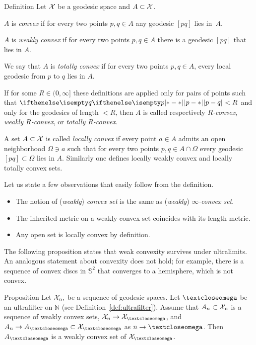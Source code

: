 \begin{thm}{Definition} 
\label{def:convex-set}
Let $\mathcal{X}$ be a geodesic space and $A\subset\spc{X}$.

$A$ is 
\emph{convex}
if for every two points $p,q\in A$ any geodesic $[pq]$ lies in~$A$.

$A$ is 
\emph{weakly convex}
if for every two points $p,q\in A$
there is a geodesic $[pq]$ 
that lies in $A$.

We say  that $A$ is 
\emph{totally convex}
if for every two points $p,q\in A$, every local geodesic from $p$ to $q$ lies in $A$.

If for some $R\in (0,\infty]$ these definitions are applied only for pairs of points such that $\dist{p}{q}{}<R$ and only for the geodesics of length $<R$,
then $A$ is called respectively 
\emph{$R$-convex},
\emph{weakly $R$-convex},
or \emph{totally $R$-convex}.

A set $A\subset\spc{X}$ is called 
\emph{locally convex}
if every point $a\in A$ admits an open neighborhood $\Omega\ni a$
such that for every two points $p,q\in A\cap\Omega$ every geodesic $[pq]\subset \Omega$ lies in $A$.
Similarly one defines locally weakly convex and locally totally convex sets. %
\end{thm}

 Let us state a few observations that easily follow  from the definition.
\begin{itemize}
\item The notion of ({}\emph{weakly}) {}\emph{convex set} is the same as ({}\emph{weakly}) {}\emph{$\infty$-convex set}.
\item The inherited metric on a weakly convex set coincides with its length metric.
\item Any open set is locally convex by definition.
\end{itemize}

The following proposition states that weak convexity survives under ultralimits.
An analogous statement about convexity does not hold;
for example, there is a sequence of convex discs in $\mathbb{S}^2$ that converges to a hemisphere, which is not convex.

\begin{thm}{Proposition}\label{prop:weak-convex-stable}%
Let $\mathcal{X}_n,$ be a sequence of geodesic spaces.
Let $\o$ be an ultrafilter on $\mathbb N$ (see Definition~\ref{def:ultrafilter}).
Assume that  $A_n\subset \spc{X}_n$ is a sequence of weakly convex sets, 
$\spc{X}_n\to \spc{X}_\o$,
and $A_n\to A_\o\subset \spc{X}_\o$ as $n\to\o$.
Then $A_\o$ is a weakly convex set of $\spc{X}_\o$.
\end{thm}

